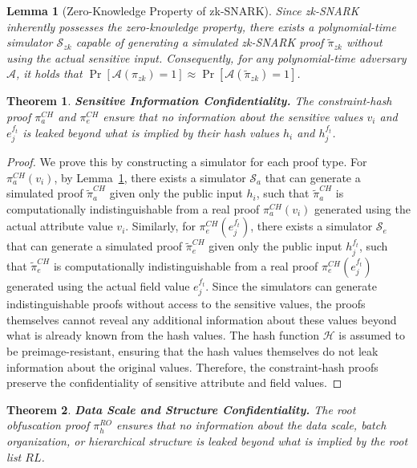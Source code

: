 \documentclass[journal]{IEEEtran}
\newtheorem{theorem}{Theorem}
\newtheorem{lemma}{Lemma}
\begin{document}
\begin{lemma}[Zero-Knowledge Property of zk-SNARK]
\label{lemma:zk-snark-property}
Since zk-SNARK inherently possesses the zero-knowledge property, there exists a polynomial-time simulator $\mathcal{S}_{zk}$ capable of generating a simulated zk-SNARK proof $\tilde{\pi}_{zk}$ without using the actual sensitive input. Consequently, for any polynomial-time adversary $\mathcal{A}$, it holds that $\Pr[\mathcal{A}(\pi_{zk}) = 1] \approx \Pr[\mathcal{A}(\tilde{\pi}_{zk}) = 1]$.
\end{lemma}

\begin{theorem}
\textbf{Sensitive Information Confidentiality.}
\label{theorem:sensitive-confidentiality}
The constraint-hash proof $\pi_{a}^{CH}$ and $\pi_{e}^{CH}$ ensure that no information about the sensitive values $v_i$ and $e_j^{f_t}$ is leaked beyond what is implied by their hash values $h_i$ and $h_j^{f_t}$.
\end{theorem}

\begin{proof}
We prove this by constructing a simulator for each proof type. For $\pi_{a}^{CH}(v_i)$, by Lemma~\ref{lemma:zk-snark-property}, there exists a simulator $\mathcal{S}_a$ that can generate a simulated proof $\tilde{\pi}_{a}^{CH}$ given only the public input $h_i$, such that $\tilde{\pi}_{a}^{CH}$ is computationally indistinguishable from a real proof $\pi_{a}^{CH}(v_i)$ generated using the actual attribute value $v_i$. Similarly, for $\pi_{e}^{CH}(e_j^{f_t})$, there exists a simulator $\mathcal{S}_e$ that can generate a simulated proof $\tilde{\pi}_{e}^{CH}$ given only the public input $h_j^{f_t}$, such that $\tilde{\pi}_{e}^{CH}$ is computationally indistinguishable from a real proof $\pi_{e}^{CH}(e_j^{f_t})$ generated using the actual field value $e_j^{f_t}$.
Since the simulators can generate indistinguishable proofs without access to the sensitive values, the proofs themselves cannot reveal any additional information about these values beyond what is already known from the hash values. The hash function $\mathcal{H}$ is assumed to be preimage-resistant, ensuring that the hash values themselves do not leak information about the original values. Therefore, the constraint-hash proofs preserve the confidentiality of sensitive attribute and field values.
\end{proof}

\begin{theorem}
\textbf{Data Scale and Structure Confidentiality.}
\label{theorem:scale-confidentiality}
The root obfuscation proof $\pi_{h}^{RO}$ ensures that no information about the data scale, batch organization, or hierarchical structure is leaked beyond what is implied by the root list $RL$.
\end{theorem}
\end{document}
